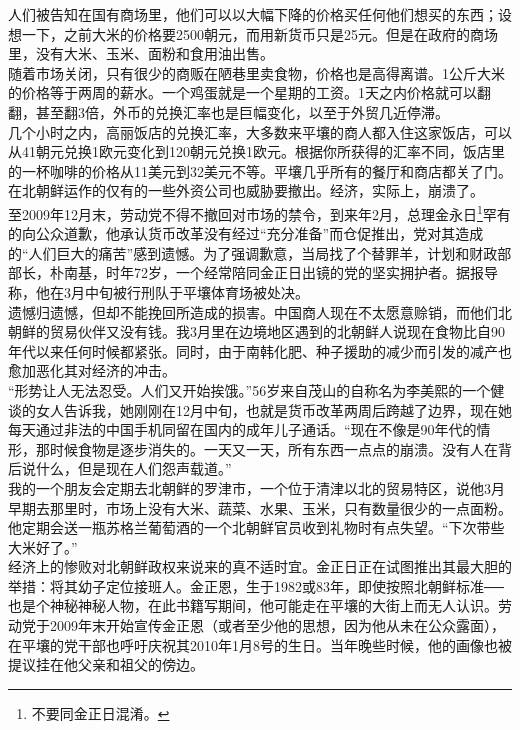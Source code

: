人们被告知在国有商场里，他们可以以大幅下降的价格买任何他们想买的东西；设想一下，之前大米的价格要2500朝元，而用新货币只是25元。但是在政府的商场里，没有大米、玉米、面粉和食用油出售。\\

随着市场关闭，只有很少的商贩在陋巷里卖食物，价格也是高得离谱。1公斤大米的价格等于两周的薪水。一个鸡蛋就是一个星期的工资。1天之内价格就可以翻翻，甚至翻3倍，外币的兑换汇率也是巨幅变化，以至于外贸几近停滞。\\

几个小时之内，高丽饭店的兑换汇率，大多数来平壤的商人都入住这家饭店，可以从41朝元兑换1欧元变化到120朝元兑换1欧元。根据你所获得的汇率不同，饭店里的一杯咖啡的价格从11美元到32美元不等。平壤几乎所有的餐厅和商店都关了门。在北朝鲜运作的仅有的一些外资公司也威胁要撤出。经济，实际上，崩溃了。\\

至2009年12月末，劳动党不得不撤回对市场的禁令，到来年2月，总理金永日\footnote{不要同金正日混淆。}罕有的向公众道歉，他承认货币改革没有经过“充分准备”而仓促推出，党对其造成的“人们巨大的痛苦”感到遗憾。为了强调歉意，当局找了个替罪羊，计划和财政部部长，朴南基，时年72岁，一个经常陪同金正日出镜的党的坚实拥护者。据报导称，他在3月中旬被行刑队于平壤体育场被处决。\\

遗憾归遗憾，但却不能挽回所造成的损害。中国商人现在不太愿意赊销，而他们北朝鲜的贸易伙伴又没有钱。我3月里在边境地区遇到的北朝鲜人说现在食物比自90年代以来任何时候都紧张。同时，由于南韩化肥、种子援助的减少而引发的减产也愈加恶化其对经济的冲击。\\

“形势让人无法忍受。人们又开始挨饿。”56岁来自茂山的自称名为李美熙的一个健谈的女人告诉我，她刚刚在12月中旬，也就是货币改革两周后跨越了边界，现在她每天通过非法的中国手机同留在国内的成年儿子通话。“现在不像是90年代的情形，那时候食物是逐步消失的。一天又一天，所有东西一点点的崩溃。没有人在背后说什么，但是现在人们怨声载道。”\\

我的一个朋友会定期去北朝鲜的罗津市，一个位于清津以北的贸易特区，说他3月早期去那里时，市场上没有大米、蔬菜、水果、玉米，只有数量很少的一点面粉。他定期会送一瓶苏格兰葡萄酒的一个北朝鲜官员收到礼物时有点失望。“下次带些大米好了。”\\

经济上的惨败对北朝鲜政权来说来的真不适时宜。金正日正在试图推出其最大胆的举措：将其幼子定位接班人。金正恩，生于1982或83年，即使按照北朝鲜标准──也是个神秘神秘人物，在此书籍写期间，他可能走在平壤的大街上而无人认识。劳动党于2009年末开始宣传金正恩（或者至少他的思想，因为他从未在公众露面），在平壤的党干部也呼吁庆祝其2010年1月8号的生日。当年晚些时候，他的画像也被提议挂在他父亲和祖父的傍边。\\

